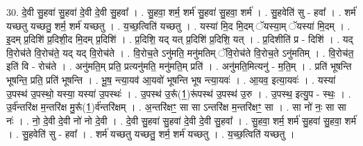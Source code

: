\documentclass[17pt]{extarticle}
\begin{document}
30. दे॒वी सु॒हवा॑ सु॒हवा॑ दे॒वी दे॒वी सु॒हवा᳚ । . सु॒हवा॒ शर्म॒ शर्म॑ सु॒हवा॑ सु॒हवा॒ शर्म॑ । . सु॒हवेति॑ सु - हवा᳚ । . शर्म॑ यच्छतु यच्छतु॒ शर्म॒ शर्म॑ यच्छतु । . य॒च्छ॒त्विति॑ यच्छतु । . यस्या॑ मि॒द मि॒दम् ॅयस्या॒म् ॅयस्या॑ मि॒दम् । . इ॒दम् प्र॒दिशि॑ प्र॒दिशी॒द मि॒दम् प्र॒दिशि॑ । . प्र॒दिशि॒ यद् यत् प्र॒दिशि॑ प्र॒दिशि॒ यत् । . प्र॒दिशीति॑ प्र - दिशि॑ । . यद् वि॒रोच॑ते वि॒रोच॑ते॒ यद् यद् वि॒रोच॑ते । . वि॒रोच॒ते ऽनु॑मति॒ मनु॑मतिम् ॅवि॒रोच॑ते वि॒रोच॒ते ऽनु॑मतिम् । . वि॒रोच॑त॒ इति॑ वि - रोच॑ते । . अनु॑मति॒म् प्रति॒ प्रत्यनु॑मति॒ मनु॑मति॒म् प्रति॑ । . अनु॑मति॒मित्यनु॑ - म॒ति॒म् । . प्रति॑ भूषन्ति भूषन्ति॒ प्रति॒ प्रति॑ भूषन्ति । . भू॒ष॒ न्त्या॒यव॑ आ॒यवो॑ भूषन्ति भूष न्त्या॒यवः॑ । . आ॒यव॒ इत्या॒यवः॑ । . यस्या॑ उ॒पस्थ॑ उ॒पस्थो॒ यस्या॒ यस्या॑ उ॒पस्थः॑ । . उ॒पस्थ॑ उ॒रू᳚(1॒)रू॑पस्थ॑ उ॒पस्थ॑ उ॒रु । . उ॒पस्थ॒ इत्यु॒प - स्थः॒ । . उ॒र्व॑न्तरि॑क्ष म॒न्तरि॑क्ष मु॒रू᳚(1॒)र्व॑न्तरि॑क्षम् । . अ॒न्तरि॑क्षꣳ॒॒ सा सा ऽन्तरि॑क्ष म॒न्तरि॑क्षꣳ॒॒ सा । . सा नो॑ नः॒ सा सा नः॑ । . नो॒ दे॒वी दे॒वी नो॑ नो दे॒वी । . दे॒वी सु॒हवा॑ सु॒हवा॑ दे॒वी दे॒वी सु॒हवा᳚ । . सु॒हवा॒ शर्म॒ शर्म॑ सु॒हवा॑ सु॒हवा॒ शर्म॑ । . सु॒हवेति॑ सु - हवा᳚ । . शर्म॑ यच्छतु यच्छतु॒ शर्म॒ शर्म॑ यच्छतु । . य॒च्छ॒त्विति॑ यच्छतु । \newline
\end{document}
